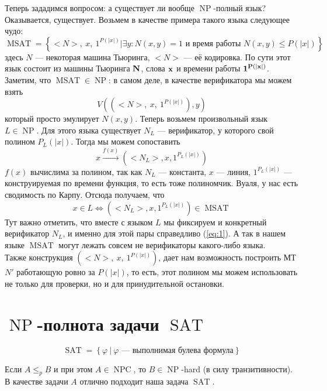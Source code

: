 \documentclass[11pt]{article}
\DeclareMathOperator{\SAT}{SAT}
\DeclareMathOperator{\MSAT}{MSAT}
\DeclareMathOperator{\NP}{NP}
\DeclareMathOperator{\NPC}{NPC}
\begin{document}
\begin{remark}
    Теперь зададимся вопросом: а существует ли вообще $\NP$-полный язык? Оказывается, существует. Возьмем в качестве примера такого 
    языка следующее чудо: 
    \[\MSAT = \left\{<N>, \ x, \ 1^{P(|x|)} \big| \exists y : N(x, y) = 1 \text{ и время работы } N(x, y) \leq P(|x|)\right\}\]
    здесь $N$ --- некоторая машина Тьюринга, $<N>$ --- её кодировка. По сути этот язык состоит из машины Тьюринга $\bf N$,
    слова $\bf x$ и времени работы $\bf 1^{P(|x|)}$. Заметим, что $\MSAT \in \NP$: в самом деле, в качестве верификатора мы можем взять 
    \[V\left(\left(<N>, \ x, \ 1^{P(|x|)}\right), y\right)\]
    который просто эмулирует $N(x, y)$. Теперь возьмем произвольный язык $L \in \NP$. Для этого языка существует $N_L$ --- верификатор, у которого свой 
    полином $P_L(|x|)$. Тогда мы можем сопоставить \[x \overset{f(x)}{\longrightarrow} \left(<N_L>, x, 1^{P_L(|x|)}\right)\] 
    $f(x)$ вычислима за полином, так как $N_L$ --- константа, $x$ --- линия, $1^{P_L(|x|)}$ --- конструируемая по времени функция, то есть тоже полиномчик.
    Вуаля, у нас есть сводимость по Карпу. Отсюда получаем, что 
    \[x \in L \Longleftrightarrow \left(<N_L>, x, 1^{P_L(|x|)}\right) \in \MSAT \label{eq:1} \tag{1}\]
    Тут важно отметить, что вместе с языком $L$ мы фиксируем и конкретный верификатор $N_L$, и именно для этой пары справедливо (\ref{eq:1}). А так 
    в нашем языке $\MSAT$ могут лежать совсем не верификаторы какого-либо языка. \\
    Также конструкция $\left(<N>, \ x, \ 1^{P(|x|)}\right)$, дает нам возможность построить МТ $N'$ работающую ровно за $P(|x|)$, то есть, этот полином 
    мы можем использовать не только для проверки, но и для принудительной остановки.
\end{remark}

\section{$\NP$-полнота задачи $\SAT$}

\begin{definition}
    \[\SAT = \left\{\varphi \ | \ \varphi \text{ --- выполнимая булева формула}\right\}\]
\end{definition}

\begin{remark}
    Если $A \leq_p B$ и при этом $A \in \NPC$, то $B \in \NP$-hard (в силу транзитивности). В качестве задачи $A$ отлично подходит наша задача $\SAT$.
\end{remark}
\end{document}

